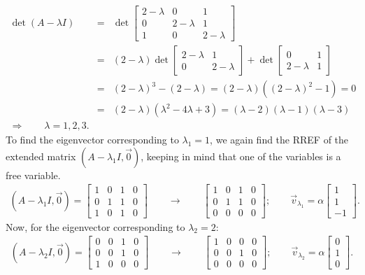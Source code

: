 \vspace{2mm}
\begin{eqnarray*}
\det(A-\lambda I) &=& \det\left[\begin{array}{ccc}2-\lambda&0&1\\0&2-\lambda&1\\1&0&2-\lambda\end{array}\right]\\
&=&(2-\lambda)\det\left[\begin{array}{cc}2-\lambda&1\\0&2-\lambda\end{array}\right]
+\det\left[\begin{array}{cc}0&1\\2-\lambda&1\end{array}\right]\\
&=&(2-\lambda)^3-(2-\lambda)=(2-\lambda)\left((2-\lambda)^2-1\right)=0\\
&=&(2-\lambda)(\lambda^2-4\lambda+3)=(\lambda-2)(\lambda-1)(\lambda-3)\\
\Rightarrow\qquad \lambda=1,2,3.
\end{eqnarray*}
To find the eigenvector corresponding to $\lambda_1=1$, we again find the RREF of the extended matrix $(A-\lambda_1 I,\vec{0})$, keeping in mind that one of the variables is a free variable.
\begin{eqnarray*}
  (A-\lambda_1 I,\vec{0})=\left[\begin{array}{ccc|c}1&0&1&0\\0&1&1&0\\1&0&1&0\end{array}\right]
	\qquad\rightarrow\qquad
	\left[\begin{array}{ccc|c}1&0&1&0\\0&1&1&0\\0&0&0&0\end{array}\right];\qquad
	\vec{v}_{\lambda_1}=\alpha\left[\begin{array}{c}1\\1\\-1\end{array}\right].
\end{eqnarray*}
Now, for the eigenvector corresponding to $\lambda_2=2$:
\begin{eqnarray*}
  (A-\lambda_2 I,\vec{0})=\left[\begin{array}{ccc|c}0&0&1&0\\0&0&1&0\\1&0&0&0\end{array}\right]
	\qquad\rightarrow\qquad\left[\begin{array}{ccc|c}1&0&0&0\\0&0&1&0\\0&0&0&0\end{array}\right];\qquad
	\vec{v}_{\lambda_2}=\alpha\left[\begin{array}{c}0\\1\\0\end{array}\right].
\end{eqnarray*}

